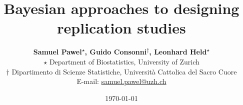 \usepackage[T1]{fontenc}
\usepackage[utf8]{inputenc}
\usepackage[english]{babel}
\usepackage{amsmath, amssymb}
\usepackage{doi} %
\usepackage[round]{natbib} %
\usepackage{multirow} %
\usepackage{longtable} %
\usepackage{booktabs} %
\usepackage[title]{appendix} %
\usepackage{nameref} %


\usepackage{times} %
\usepackage[semibold]{sourcesanspro} %
\usepackage{sectsty} %
\allsectionsfont{\sffamily} %
\usepackage[onehalfspacing]{setspace} %
\usepackage[labelfont=bf,font=small]{caption} %


\usepackage{tikz}
\usetikzlibrary{positioning,shapes,fit}

\usepackage{geometry}

\newcommand\longtitle{Bayesian approaches to designing replication studies}
\newcommand\shorttitle{\longtitle} %
\newcommand\longauthors{Samuel Pawel\textsuperscript{$\star$}, Guido
  Consonni\textsuperscript{$\dagger$}, Leonhard
  Held\textsuperscript{$\star$}}
\newcommand\shortauthors{S. Pawel, G. Consonni,
  L. Held} %
\newcommand\affiliation{
  $\star$ Department of Biostatistics, University of Zurich \\
  $\dagger$ Dipartimento di Scienze Statistiche, Universit\`{a} Cattolica del Sacro
  Cuore } \newcommand\mail{samuel.pawel@uzh.ch} \title{ \vspace{-2em}
  \textbf{\longtitle} } \author{
  \textbf{\longauthors} \\
  \affiliation \\
  E-mail: \href{mailto:\mail}{\mail} }
  \date{\today} %

